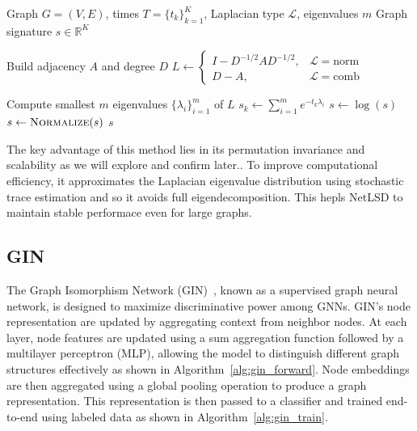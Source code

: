 \begin{algorithm}[t]
\footnotesize
\caption{NetLSD (Heat Trace Signature)}
\label{alg:netlsd}
\begin{algorithmic}[1]
\Require Graph $G=(V,E)$, times $T=\{t_k\}_{k=1}^K$, Laplacian type $\mathcal{L}$, eigenvalues $m$
\Ensure Graph signature $s \in \mathbb{R}^K$

\State Build adjacency $A$ and degree $D$
\State $L \gets \begin{cases}
I - D^{-1/2}AD^{-1/2}, & \mathcal{L}=\text{norm} \\
D-A, & \mathcal{L}=\text{comb}
\end{cases}$

\State Compute smallest $m$ eigenvalues $\{\lambda_i\}_{i=1}^m$ of $L$
  \State $s_k \gets \sum_{i=1}^m e^{-t_k\lambda_i}$
\EndFor
\State $s \gets \log(s)$ 
\State $s \gets \textsc{Normalize}(s)$ 
\State \Return $s$
\end{algorithmic}
\end{algorithm}


The key advantage of this method lies in its permutation invariance and scalability as we will explore and confirm later..
To improve computational efficiency, it approximates the Laplacian eigenvalue distribution using stochastic trace estimation and so it avoids full eigendecomposition.
This hepls NetLSD to maintain stable performace even for large graphs. 

\subsection{GIN}
The Graph Isomorphism Network (GIN)~\cite{xu2019gin}, known as a supervised graph neural network, is designed to maximize discriminative power among GNNs.
GIN's node representation are updated by aggregating context from neighbor nodes.
At each layer, node features are updated using a sum aggregation function followed by a multilayer perceptron (MLP), 
allowing the model to distinguish different graph structures effectively as shown in Algorithm~\ref{alg:gin_forward}.
Node embeddings are then aggregated using a global pooling operation to produce a graph representation. 
This representation is then passed to a classifier and trained end-to-end using labeled data as shown in Algorithm~\ref{alg:gin_train}.

